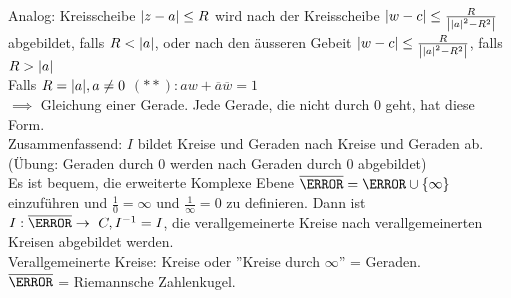 Analog: Kreisscheibe $\abs{z-a} \leq R$ wird nach der Kreisscheibe $\abs{w-c} \leq \frac{R}{\abs{\abs{a}^2 - R^2}}$ abgebildet, falls $R < \abs{a}$, oder nach den äusseren Gebeit $\abs{w-c} \leq \frac{R}{\abs{\abs{a}^2 - R^2}}$, falls $R > \abs{a}$ \\
Falls $R = \abs{a} , a \neq 0$
$(**): aw + \overline{a}\overline{w} = 1$ \\
$\implies$ Gleichung einer Gerade. Jede Gerade, die nicht durch $0$ geht, hat diese Form. \\
Zusammenfassend: $I$ bildet Kreise und Geraden nach Kreise und Geraden ab. (Übung: Geraden durch $0$ werden nach Geraden durch $0$ abgebildet) \\
Es ist bequem, die erweiterte Komplexe Ebene $\overline{\C} = \C \cup \{\infty\}$ einzuführen und $\frac{1}{0} = \infty$ und $\frac{1}{\infty} = 0$ zu definieren. Dann ist $I : \overline{\C} \rightarrow C , I^{-1} = I$, die verallgemeinerte Kreise nach verallgemeinerten Kreisen abgebildet werden. \\
Verallgemeinerte Kreise: Kreise oder ''Kreise durch $\infty$'' = Geraden. \\
$\overline{\C}$ = Riemannsche Zahlenkugel.

